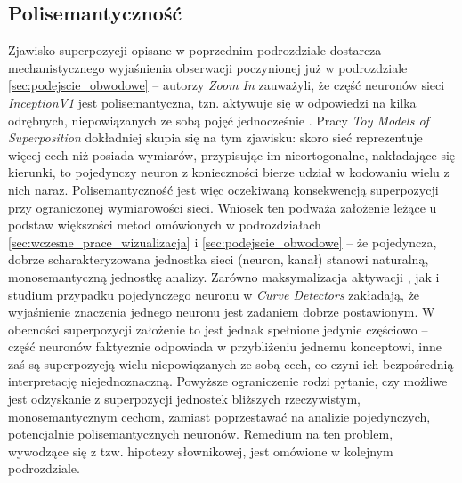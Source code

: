 \subsection{Polisemantyczność}
\label{sec:polisemantycznosc}
Zjawisko superpozycji opisane w poprzednim podrozdziale dostarcza mechanistycznego wyjaśnienia obserwacji poczynionej już w podrozdziale \ref{sec:podejscie_obwodowe} -- autorzy \textit{Zoom In} \cite{olah_2020_zoom_in_circuits} zauważyli, że część neuronów sieci \textit{InceptionV1} jest polisemantyczna, tzn. aktywuje się w odpowiedzi na kilka odrębnych, niepowiązanych ze sobą pojęć jednocześnie \cite{olah_2020_zoom_in_circuits}. Pracy \textit{Toy Models of Superposition} dokładniej skupia się na tym zjawisku: skoro sieć reprezentuje więcej cech niż posiada wymiarów, przypisując im nieortogonalne, nakładające się kierunki, to pojedynczy neuron z konieczności bierze udział w kodowaniu wielu z nich naraz. Polisemantyczność jest więc oczekiwaną konsekwencją superpozycji przy ograniczonej wymiarowości sieci. \newline
Wniosek ten podważa założenie leżące u podstaw większości metod omówionych w podrozdziałach \ref{sec:wczesne_prace_wizualizacja} i \ref{sec:podejscie_obwodowe} -- że pojedyncza, dobrze scharakteryzowana jednostka sieci (neuron, kanał) stanowi naturalną, monosemantyczną jednostkę analizy. Zarówno maksymalizacja aktywacji \cite{olah_2017_feature_visualization}, jak i studium przypadku pojedynczego neuronu w \textit{Curve Detectors} \cite{cammarata_2020_curve_detectors} zakładają, że wyjaśnienie znaczenia jednego neuronu jest zadaniem dobrze postawionym. W obecności superpozycji założenie to jest jednak spełnione jedynie częściowo -- część neuronów faktycznie odpowiada w przybliżeniu jednemu konceptowi, inne zaś są superpozycją wielu niepowiązanych ze sobą cech, co czyni ich bezpośrednią interpretację niejednoznaczną. \newline
Powyższe ograniczenie rodzi pytanie, czy możliwe jest odzyskanie z superpozycji jednostek bliższych rzeczywistym, monosemantycznym cechom, zamiast poprzestawać na analizie pojedynczych, potencjalnie polisemantycznych neuronów. Remedium na ten problem, wywodzące się z tzw. hipotezy słownikowej, jest omówione w kolejnym podrozdziale.
